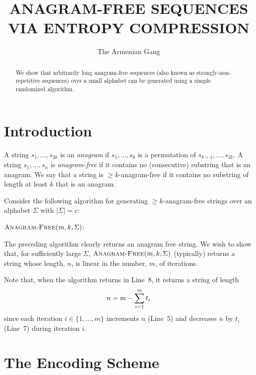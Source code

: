 \documentclass{patmorin}
\title{\MakeUppercase{Anagram-Free Sequences via Entropy Compression}}
\author{The Armenian Gang}
\begin{document}
\maketitle

\begin{abstract}
  We show that arbitrarily long anagram-free sequences (also known as strongly-non-repetitive sequences) over a small alphabet can be generated using a simple randomized algorithm.
\end{abstract}

\section{Introduction}

A string $s_1,\ldots,s_{2k}$ is an \emph{anagram} if $s_1,\ldots,s_k$ is a permutation of $s_{k+1},\ldots,s_{2k}$.  A string $s_1,\ldots,s_n$ is \emph{anagram-free} if it contains no (consecutive) substring that is an anagram.  We say that a string is $\ge k$-anagram-free if it contains no substring of length at least $k$ that is an anagram.

Consider the following algorithm for generating $\ge k$-anagram-free strings over an alphabet $\Sigma$ with $|\Sigma|=c$:

\noindent$\textsc{Anagram-Free}(m, k, \Sigma)$:
\begin{algorithmic}[1]
  \ENDFOR
\end{algorithmic}

The preceding algorithm clearly returns an anagram free string.  We wish to show that, for sufficiently large $\Sigma$, $\textsc{Anagram-Free}(m, k, \Sigma)$ (typically) returns a string whose length, $n$, is linear in the number, $m$, of iterations.

Note that, when the algorithm returns in Line~8, it returns a string of length
\begin{equation}  
  n = m - \sum_{i=1}^m t_i  \eqlabel{sumsize}
\end{equation}
since each iteration $i\in\{1,\ldots,m\}$ increments $n$ (Line~5) and decreases $n$ by $t_i$ (Line~7) during iteration $i$.

\section{The Encoding Scheme}
\end{document}
